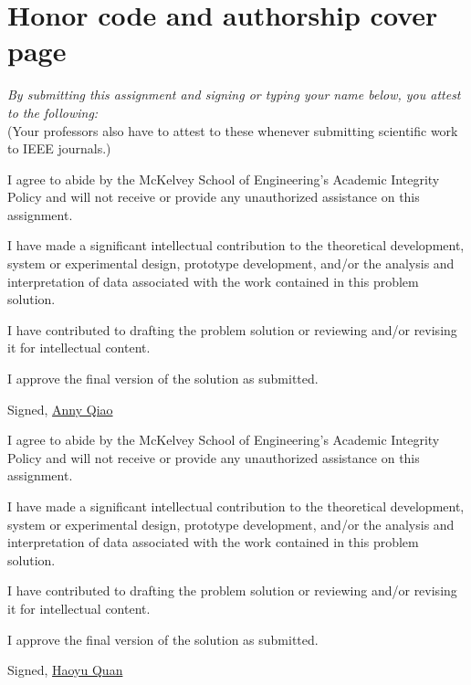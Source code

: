 \documentclass[11pt,letterpaper]{article}
\begin{document}
\section*{Honor code and authorship cover page}

\noindent \textit{By submitting this assignment and signing or typing your name below, you attest to the following:} \\
(Your professors also have to attest to these whenever submitting scientific work to IEEE journals.)

\begin{todolist}[label={\checkmark}]
    \item I agree to abide by the McKelvey School of Engineering's Academic Integrity Policy and will not receive or provide any unauthorized assistance on this assignment.
    \item I have made a significant intellectual contribution to the theoretical development, system or experimental design, prototype development, and/or the analysis and interpretation of data associated with the work contained in this problem solution.
    \item I have contributed to drafting the problem solution or reviewing and/or revising it for intellectual content.
    \item I approve the final version of the solution as submitted.
\end{todolist}

\vspace{10pt}

\noindent Signed, \underline{Anny Qiao}

\begin{todolist}[label={\checkmark}]
    \item I agree to abide by the McKelvey School of Engineering's Academic Integrity Policy and will not receive or provide any unauthorized assistance on this assignment.
    \item I have made a significant intellectual contribution to the theoretical development, system or experimental design, prototype development, and/or the analysis and interpretation of data associated with the work contained in this problem solution.
    \item I have contributed to drafting the problem solution or reviewing and/or revising it for intellectual content.
    \item I approve the final version of the solution as submitted.
\end{todolist}

\vspace{10pt}

\noindent Signed, \underline{Haoyu Quan}
\end{document}
